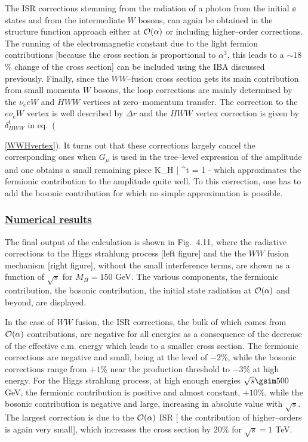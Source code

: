 The ISR corrections stemming from the radiation of a photon from the initial
$\ee$ states and from the intermediate $W$ bosons, can again be obtained in the
structure function approach either at ${\cal O}(\alpha)$  or including 
higher--order corrections. The running of the electromagnetic constant due to 
the light fermion contributions [because the cross section  is proportional to
$\alpha^3$, this leads to a $\sim 18$\% change of the cross section]  can be
included using the IBA discussed previously. Finally,  since the $WW$--fusion
cross section gets its main contribution from  small momenta $W$ bosons, the
loop corrections are mainly determined  by the $\nu_e eW$ and $HWW$ vertices at
zero--momentum transfer.  The  correction to the  $e\nu_eW$ vertex is well
described by $\Delta r$ and  the $HWW$ vertex correction is given by
$\delta^t_{HWW}$ in eq.~({\ref{WWHvertex}). It turns out that these corrections
largely cancel the corresponding ones when $G_\mu$ is used in the tree--level
expression of the amplitude and one obtains a small remaining piece \cite{RCWW1}
\beq
K_{\ee \to H \nu \bar{\nu} }^{t} = 1 -   
\eeq
which approximates the fermionic contribution to the amplitude quite 
well. To this correction, one has to add the bosonic contribution for which
no simple approximation is possible.

\vspace*{-2mm}
\subsubsection*{\underline{Numerical results}}

The final output of the calculation is shown in Fig.~4.11, where the radiative
corrections to the Higgs strahlung process [left figure] and the the $WW$ 
fusion mechanism [right figure], without the small interference terms, are shown
as a function of $\sqrt{s}$ for $M_H=150$ GeV. The various components, the 
fermionic contribution, the bosonic contribution, the  initial state radiation
at ${\cal O}(\alpha)$ and beyond, are displayed. \s

In the case of $WW$ fusion, the ISR corrections, the bulk of which comes from
${\cal O}(\alpha)$ contributions, are negative for all energies as a
consequence of the decrease of the effective c.m. energy which leads to a
smaller cross section. The fermionic corrections are negative and small, being
at the level of $-2$\%, while the bosonic corrections range from $+1$\%   near
the production threshold to $-3$\% at high energy.  For the Higgs strahlung
process, at high enough energies $\sqrt{s}\gsim 500$ GeV, the fermionic
contribution is positive and almost constant, $+10\%$, while the bosonic 
contribution is negative and large, increasing in absolute value with 
$\sqrt{s}$. The largest correction is due to the ${\cal O}(\alpha)$ ISR [
the contribution of higher--orders is again very small], which increases the 
cross section by $20$\% for $\sqrt{s}=1$ TeV.\s

}
